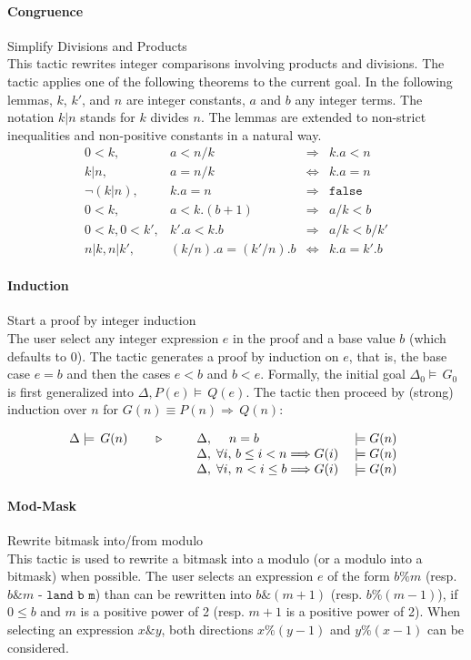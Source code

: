\paragraph{Congruence} Simplify Divisions and Products \\
This tactic rewrites integer comparisons involving products and divisions.
The tactic applies one of the following theorems to the current goal.
In the following lemmas, $k$, $k'$, and $n$ are integer constants, $a$ and $b$ any integer terms.
The notation $k|n$ stands for $k$ divides $n$.
The lemmas are extended to non-strict inequalities and non-positive constants in a natural way.
\[
\begin{array}{crcl}
0<k, & a < n/k &\Longrightarrow& k.a < n \\
k|n, & a = n/k &\Longleftrightarrow& k.a = n \\
\neg(k|n), & k.a = n & \Longrightarrow & \mathtt{false} \\
0<k, & a < k.(b+1) &\Longrightarrow& a/k < b \\
0<k, 0<k', & k'.a < k.b &\Longrightarrow& a/k < b/k' \\
n|k, n|k', & (k/n).a = (k'/n).b &\Longleftrightarrow& k.a = k'.b
\end{array}
\]

\paragraph{Induction} Start a proof by integer induction \\
The user select any integer expression $e$ in the proof and a base value $b$ (which defaults to
0). The tactic generates a proof by induction on $e$, that is, the base case
$e = b$ and then the cases $e < b$ and $b < e$. Formally, the initial goal
$\Delta_0\models\,G_0$ is first generalized into $\Delta,P(e)\models\,Q(e)$. The tactic
then proceed by (strong) induction over $n$ for
$G(n) \equiv P(n)\Longrightarrow\,Q(n)$:

\[\TACTIC{\Delta\models\,G(n)}{%
\begin{array}[t]{lll}
\Delta,\; \quad n = b & \models G(n) \\
\Delta,\; \forall i,\, b \leq i < n \Longrightarrow G(i) \; & \models G(n) \\
\Delta,\; \forall i,\, n < i \leq b \Longrightarrow G(i) \; & \models G(n)
\end{array}} \]

\paragraph{Mod-Mask} Rewrite bitmask into/from modulo \\
This tactic is used to rewrite a bitmask into a modulo (or a modulo into a
bitmask) when possible. The user selects an expression $e$ of the form
$b \% m$ (resp. $b \& m$ - $\texttt{land b m}$) than can be rewritten into
$b \& (m+1)$ (resp. $b \% (m - 1)$), if $0 \leq b$ and $m$ is a positive power
of 2 (resp. $m + 1$ is a positive power of 2). When selecting an expression
$x \& y$, both directions $x \% (y - 1)$ and $y \% (x - 1)$ can be considered.

